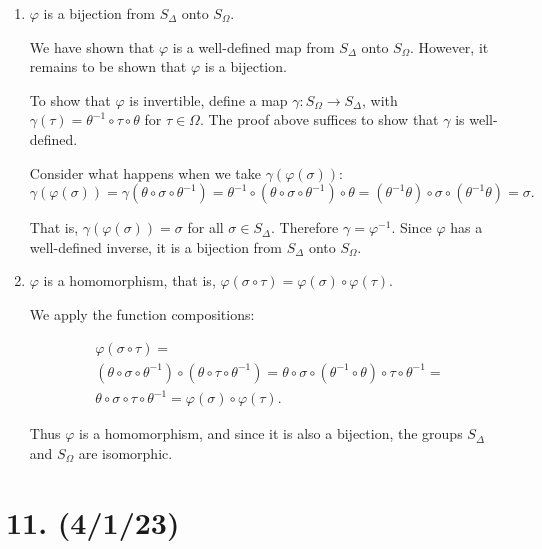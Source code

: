 \documentclass{article}
\begin{document}
\begin{enumerate}[label=(\alph*)]
    \item $\varphi$ is a bijection from $S_\Delta$ onto $S_\Omega$.
        
        We have shown that $\varphi$ is a well-defined map from $S_\Delta$ onto $S_\Omega$. However, it remains to be shown that $\varphi$ is a bijection.

        To show that $\varphi$ is invertible, define a map $\gamma: S_\Omega \rightarrow S_\Delta$, with $\gamma(\tau) = \theta^{-1} \circ \tau \circ \theta$ for $\tau \in \Omega$. The proof above suffices to show that $\gamma$ is well-defined.

        Consider what happens when we take $\gamma(\varphi(\sigma))$:
        \begin{equation*}
            \gamma(\varphi(\sigma)) = \gamma(\theta \circ \sigma \circ \theta^{-1}) = \theta^{-1} \circ (\theta \circ \sigma \circ \theta^{-1}) \circ \theta = (\theta^{-1} \theta) \circ \sigma \circ (\theta^{-1} \theta) = \sigma.
        \end{equation*}

        That is, $\gamma(\varphi(\sigma)) = \sigma$ for all $\sigma \in S_\Delta$. Therefore $\gamma = \varphi^{-1}$. Since $\varphi$ has a well-defined inverse, it is a bijection from $S_\Delta$ onto $S_\Omega$.

    \item $\varphi$ is a homomorphism, that is, $\varphi(\sigma \circ \tau) = \varphi(\sigma) \circ \varphi(\tau)$.

        We apply the function compositions: 
        
        \begin{multline*}
            \varphi(\sigma \circ \tau) = \\
            (\theta \circ \sigma \circ \theta^{-1}) \circ (\theta \circ \tau \circ \theta^{-1}) =
            \theta \circ \sigma \circ (\theta^{-1} \circ \theta) \circ \tau \circ \theta^{-1} = \\
            \theta \circ \sigma \circ \tau \circ \theta^{-1} = \varphi(\sigma) \circ \varphi(\tau).
        \end{multline*}

        Thus $\varphi$ is a homomorphism, and since it is also a bijection, the groups $S_\Delta$ and $S_\Omega$ are isomorphic.
\end{enumerate}

\section*{11. (4/1/23)}
\end{document}
